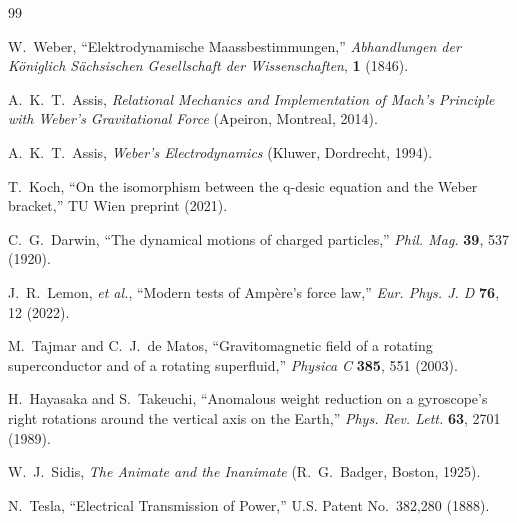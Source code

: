 \documentclass[12pt,preprint,amsmath,amssymb]{revtex4-2}
\begin{document}
\begin{thebibliography}{99}

W.~Weber, ``Elektrodynamische Maassbestimmungen,''
\textit{Abhandlungen der K\"oniglich S\"achsischen Gesellschaft der Wissenschaften},
\textbf{1} (1846).

A.~K.~T.~Assis, \textit{Relational Mechanics and Implementation of Mach's Principle
with Weber's Gravitational Force} (Apeiron, Montreal, 2014).

A.~K.~T.~Assis, \textit{Weber's Electrodynamics} (Kluwer, Dordrecht, 1994).

T.~Koch, ``On the isomorphism between the q-desic equation and the Weber bracket,''
TU Wien preprint (2021).

C.~G.~Darwin, ``The dynamical motions of charged particles,''
\textit{Phil. Mag.} \textbf{39}, 537 (1920).

J.~R.~Lemon, \textit{et al.}, ``Modern tests of Amp\`ere's force law,''
\textit{Eur. Phys. J. D} \textbf{76}, 12 (2022).

M.~Tajmar and C.~J.~de Matos, ``Gravitomagnetic field of a rotating superconductor
and of a rotating superfluid,'' \textit{Physica C} \textbf{385}, 551 (2003).

H.~Hayasaka and S.~Takeuchi, ``Anomalous weight reduction on a gyroscope's right
rotations around the vertical axis on the Earth,''
\textit{Phys. Rev. Lett.} \textbf{63}, 2701 (1989).

W.~J.~Sidis, \textit{The Animate and the Inanimate} (R.~G.~Badger, Boston, 1925).

N.~Tesla, ``Electrical Transmission of Power,'' U.S. Patent No.~382,280 (1888).

\end{thebibliography}
\end{document}
